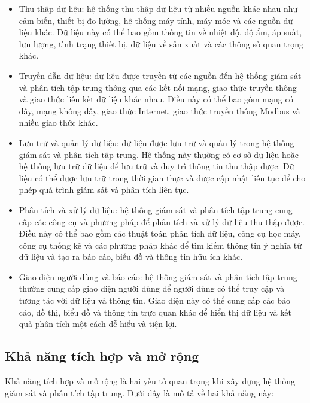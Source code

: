 \begin{itemize}
	\item Thu thập dữ liệu: hệ thống thu thập dữ liệu từ nhiều nguồn khác nhau như cảm biến, thiết bị đo lường, hệ thống máy tính, máy móc và các nguồn dữ liệu khác. Dữ liệu này có thể bao gồm thông tin về nhiệt độ, độ ẩm, áp suất, lưu lượng, tình trạng thiết bị, dữ liệu về sản xuất và các thông số quan trọng khác.
	\item Truyền dẫn dữ liệu: dữ liệu được truyền từ các nguồn đến hệ thống giám sát và phân tích tập trung thông qua các kết nối mạng, giao thức truyền thông và giao thức liên kết dữ liệu khác nhau. Điều này có thể bao gồm mạng có dây, mạng không dây, giao thức Internet, giao thức truyền thông Modbus và nhiều giao thức khác.
	\item Lưu trữ và quản lý dữ liệu: dữ liệu được lưu trữ và quản lý trong hệ thống giám sát và phân tích tập trung. Hệ thống này thường có cơ sở dữ liệu hoặc hệ thống lưu trữ dữ liệu để lưu trữ và duy trì thông tin thu thập được. Dữ liệu có thể được lưu trữ trong thời gian thực và được cập nhật liên tục để cho phép quá trình giám sát và phân tích liên tục.
	\item Phân tích và xử lý dữ liệu: hệ thống giám sát và phân tích tập trung cung cấp các công cụ và phương pháp để phân tích và xử lý dữ liệu thu thập được. Điều này có thể bao gồm các thuật toán phân tích dữ liệu, công cụ học máy, công cụ thống kê và các phương pháp khác để tìm kiếm thông tin ý nghĩa từ dữ liệu và tạo ra báo cáo, biểu đồ và thông tin hữu ích khác.
	\item Giao diện người dùng và báo cáo: hệ thống giám sát và phân tích tập trung thường cung cấp giao diện người dùng để người dùng có thể truy cập và tương tác với dữ liệu và thông tin. Giao diện này có thể cung cấp các báo cáo, đồ thị, biểu đồ và thông tin trực quan khác để hiển thị dữ liệu và kết quả phân tích một cách dễ hiểu và tiện lợi.
\end{itemize}

\subsection{Khả năng tích hợp và mở rộng}
Khả năng tích hợp và mở rộng là hai yếu tố quan trọng khi xây dựng hệ thống giám sát và phân tích tập trung. Dưới đây là mô tả về hai khả năng này:

